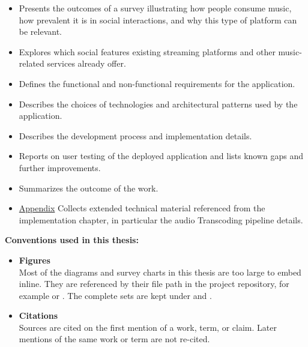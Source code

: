 \begin{itemize}
    \item {}
    Presents the outcomes of a survey illustrating how people consume music,
    how prevalent it is in social interactions, and why this type of platform can be relevant.

    \item {}
    Explores which social features existing streaming platforms and other music-related services already offer.

    \item {}
    Defines the functional and non-functional requirements for the application.

    \item {}
    Describes the choices of technologies and architectural patterns used by the application.

    \item {}
    Describes the development process and implementation details.

    \item {}
    Reports on user testing of the deployed application and lists known gaps and further improvements.

    \item {}
    Summarizes the outcome of the work.

    \item \hyperref[ch:appendix]{Appendix}
    Collects extended technical material referenced from the
    implementation chapter, in particular the audio Transcoding pipeline
    details.
\end{itemize}

\noindent\textbf{Conventions used in this thesis:}

\begin{itemize}
    \item \textbf{Figures} \\
    Most of the diagrams and survey charts in this thesis are too large to embed
    inline. They are referenced by their file path in the project
    repository, for example 
    or .
    The complete sets are kept under 
    and .

    \item \textbf{Citations} \\
    Sources are cited on the first mention of a work, term, or claim.
    Later mentions of the same work or term are not re-cited.
\end{itemize}